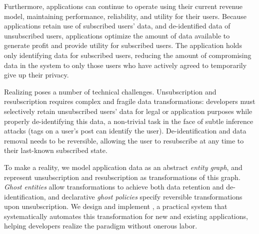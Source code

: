 Furthermore, applications can continue to operate using their current revenue model, maintaining
performance, reliability, and utility for their users.  Because applications retain use of
subscribed users' data, and de-identified data of unsubscribed users, applications optimize the
amount of data available to generate profit and provide utility for subscribed users. The
application holds only identifying data for subscribed users, reducing the amount of
compromising data in the system to only those users who have actively agreed to temporarily give up
their privacy.

Realizing \name poses a number of technical challenges.
Unsubscription and resubscription requires complex and fragile data transformations: developers must
selectively retain unsubscribed users' data for legal or application purposes while properly
de-identifying this data, a non-trivial task in the face of subtle inference attacks (\eg tags on a
user's post can identify the user). De-identification and data removal needs to be reversible,
allowing the user to resubscribe at any time to their last-known subscribed state.

To make \name a reality, we model application data as an abstract \emph{entity graph}, and
represent unsubscription and resubscription as transformations of this graph.
\emph{Ghost entities} allow transformations to achieve both data retention and de-identification,
and declarative \emph{ghost policies} specify reversible transformations upon unsubscription.
We design and implement \sys, a practical system that systematically automates this transformation for new and existing applications, helping developers realize the \name paradigm without onerous labor.
\fi
